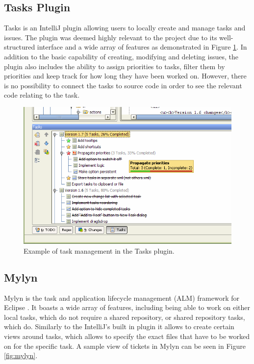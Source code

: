 \documentclass{4thYearProject}
\begin{document}
\subsection{Tasks Plugin}

Tasks\cite{tasksplugin} is an IntelliJ plugin allowing users to locally create and manage tasks and issues. The plugin was deemed highly relevant to the project due to its well-structured interface and a wide array of features as demonstrated in Figure \ref{fig:tasks}. In addition to the basic capability of creating, modifying and deleting issues, the plugin also includes the ability to assign priorities to tasks, filter them by priorities and keep track for how long they have been worked on. However, there is no possibility to connect the tasks to source code in order to see the relevant code relating to the task. 

\begin{figure}[H]
\includegraphics[scale=0.6]{Tasks}
\centering
\caption{Example of task management in the Tasks plugin.}
\label{fig:tasks}
\end{figure}

\subsection{Mylyn}

Mylyn is the task and application lifecycle management (ALM) framework for Eclipse \cite{mylyn}. It boasts a wide array of features, including being able to work on either local tasks, which do not require a shared repository, or shared repository tasks, which do. Similarly to the IntelliJ's built in plugin it allows to create certain views around tasks, which allows to specify the exact files that have to be worked on for the specific task. A sample view of tickets in Mylyn can be seen in Figure \ref{fig:mylyn}.
\end{document}
